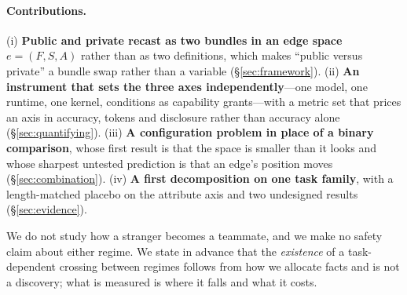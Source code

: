 \paragraph{Contributions.} (i) \textbf{Public and private recast as two bundles in an edge
space} $e=(F,S,A)$ rather than as two definitions, which makes ``public versus private'' a
bundle swap rather than a variable (\S\ref{sec:framework}). (ii) \textbf{An instrument that
sets the three axes independently}---one model, one runtime, one kernel, conditions as
capability grants---with a metric set that prices an axis in accuracy, tokens and
disclosure rather than accuracy alone (\S\ref{sec:quantifying}). (iii) \textbf{A
configuration problem in place of a binary comparison}, whose first result is that the
space is smaller than it looks and whose sharpest untested prediction is that an edge's
position moves (\S\ref{sec:combination}). (iv) \textbf{A first decomposition on one task
family}, with a length-matched placebo on the attribute axis and two undesigned results
(\S\ref{sec:evidence}).

We do not study how a stranger becomes a teammate, and we make no safety claim about
either regime. We state in advance that the \emph{existence} of a task-dependent crossing
between regimes follows from how we allocate facts and is not a discovery; what is
measured is where it falls and what it costs.
